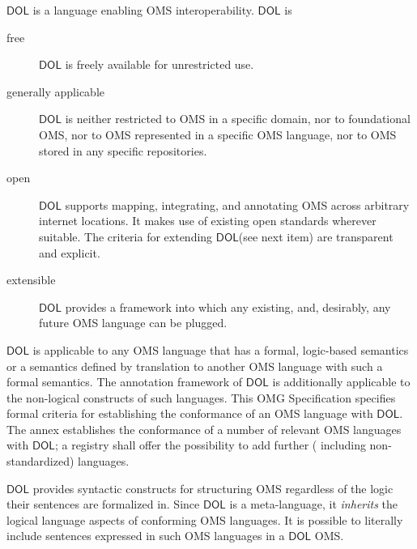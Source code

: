 \documentclass[10pt,fleqn,final]{scrreprt}
\newcommand{\cbs}[0]{\color{red}\xspace} %
\newcommand{\cbe}[0]{\color{black}\xspace} %
\newcommand*{\IS}{OMG Specification\xspace}
\newcommand*{\DOL}{\ensuremath{\mathsf{DOL}}\xspace}
\newenvironment{definitions}[0]{\medskip }{}
\begin{document}
\begin{definitions}
\DOL is a language enabling OMS interoperability. 
\DOL is
\begin{description}
\item[free] \DOL is freely available for unrestricted use.
\item[generally applicable] \DOL is neither restricted to OMS in a specific domain, nor to foundational OMS, nor to OMS represented in a specific OMS language, nor to OMS stored in any specific repositories.
\item[open] \DOL supports mapping, integrating, and annotating OMS across arbitrary internet locations.  It makes use of existing open standards wherever suitable.  The criteria for extending \DOL (see next item) are transparent and explicit.
\item[extensible] \DOL provides a framework into which any existing, and, desirably, any future OMS language can be plugged.
\end{description}
\DOL is applicable to any OMS language that has a formal, logic-based semantics or a semantics defined by translation to another OMS language with such a formal semantics. The annotation framework of \DOL is additionally applicable to the non-logical constructs of such languages. This \IS specifies formal criteria for establishing the conformance of an OMS language with \DOL.  The annex establishes the conformance of a number of relevant OMS languages with \DOL; a registry shall offer the possibility to add further (\cbs including\cbe non-standardized) languages. 

\DOL provides syntactic constructs for structuring OMS regardless of the logic their sentences are formalized in. 
Since \DOL is a meta-language,  it \textit{inherits} the logical language aspects of conforming OMS languages.  It is possible to literally include sentences expressed in such OMS languages in a \DOL OMS.



\end{definitions}
\end{document}
